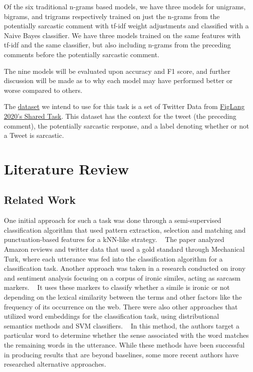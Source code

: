 \documentclass[11pt,a4paper]{article}
\begin{document}
Of the six traditional n-grams based models, we have three models for unigrams, bigrams, and trigrams respectively trained on just the n-grams from the potentially sarcastic comment 
with tf-idf \cite{Salton:86} weight adjustments and classified with a Naive Bayes classifier. 
We have three models trained on the same features with tf-idf and the same classifier, but also including n-grams from the preceding comments before the potentially sarcastic
comment.

The nine models will be evaluated upon accuracy and F1 score, and further discussion will be made as to why
each model may have performed better or worse compared
to others.

The \href{https://github.com/EducationalTestingService/sarcasm/releases}{dataset} we intend to use for this task is a set of Twitter Data from \href{https://sites.google.com/view/figlang2020/}{FigLang 2020's Shared Task}. This dataset has the context for the tweet (the preceding comment), the potentially sarcastic response, and a label denoting whether or not a Tweet is sarcastic.

\section{Literature Review}
\subsection{Related Work}

One initial approach for such a task was done through a semi-supervised classification algorithm that used pattern extraction, selection and matching and punctuation-based features for a kNN-like strategy. ~\cite{10.5555/1870568.1870582} The paper analyzed Amazon reviews and twitter data that used a gold standard through Mechanical Turk, where each utterance was fed into the classification algorithm for a classification task. Another approach was taken in a research conducted on irony and sentiment analysis focusing on a corpus of ironic similes, acting as sarcasm markers. ~\cite{Veale10detectingironic} It uses these markers to classify whether a simile is ironic or not depending on the lexical similarity between the terms and other factors like the frequency of its occurrence on the web. There were also other approaches that utilized word embeddings for the classification task, using distributional semantics methods and SVM classifiers. ~\cite{Ghosh2015SarcasticON} In this method, the authors target a particular word to determine whether the sense associated with the word matches the remaining words in the utterance. While these methods have been successful in producing results that are beyond baselines, some more recent authors have researched alternative approaches. 
\end{document}
